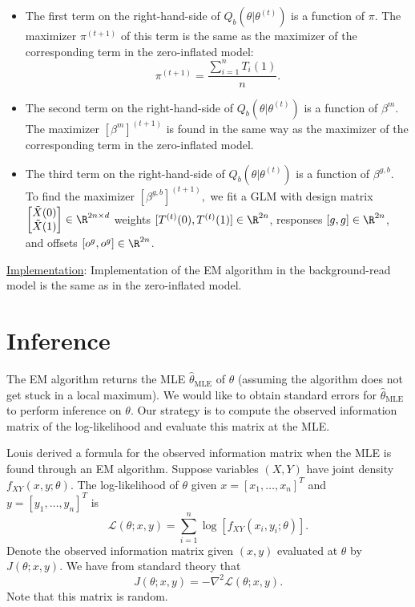 \documentclass[12pt]{article}
\begin{document}
\begin{itemize}
\item The first term on the right-hand-side of $Q_b(\theta | \theta^{(t)})$ is a function of $\pi$. The maximizer $\pi^{(t + 1)}$ of this term is the same as the maximizer of the corresponding term in the zero-inflated model:
$$ \pi^{(t+1)} = \frac{\sum_{i=1}^n T_i(1)}{n}.$$
\item The second term on the right-hand-side of $Q_b(\theta| \theta^{(t)})$ is a function of $\beta^m.$ The maximizer $[\beta^m]^{(t + 1)}$ is found in the same way as the maximizer of the corresponding term in the zero-inflated model.
\item The third term on the right-hand-side of $Q_b(\theta | \theta^{(t)})$ is a function of $\beta^{g, b}.$ To find the maximizer $[\beta^{g,b}]^{(t + 1)},$ we fit a GLM with design matrix $\begin{bmatrix} \tilde{X}(0) \\ \tilde{X}(1) \end{bmatrix} \in \R^{2n \times d}$ weights $[T^{(t)}(0), T^{(t)}(1)] \in \R^{2n}$, responses $[g,g] \in \R^{2n}$, and offsets $[o^g, o^g] \in \R^{2n}$.
\end{itemize}
\underline{Implementation}: Implementation of the EM algorithm in the background-read model is the same as in the zero-inflated model.

\section{Inference}

The EM algorithm returns the MLE $\hat{\theta}_{ \textrm{MLE} }$ of $\theta$ (assuming the algorithm does not get stuck in a local maximum). We would like to obtain standard errors for $\hat{\theta}_{\textrm{MLE}}$ to perform inference on $\theta$. Our strategy is to compute the observed information matrix of the log-likelihood and evaluate this matrix at the MLE.

Louis \cite{Louis1982} derived a formula for the observed information matrix when the MLE is found through an EM algorithm. Suppose variables $(X,Y)$ have joint density $f_{XY}(x, y; \theta)$. The log-likelihood of $\theta$ given $x = [x_1, \dots, x_n]^T$ and $y = [y_1, \dots, y_n]^T$ is
$$ \mathcal{L}(\theta; x, y) = \sum_{i=1}^n \log \left[ f_{XY}(x_i,y_i;\theta) \right].$$ Denote the observed information matrix given $(x,y)$ evaluated at $\theta$ by $J(\theta; x,y)$. We have from standard theory that $$J(\theta; x, y) = - \nabla^2 \mathcal{L}(\theta; x, y).$$ Note that this matrix is random.
\end{document}
